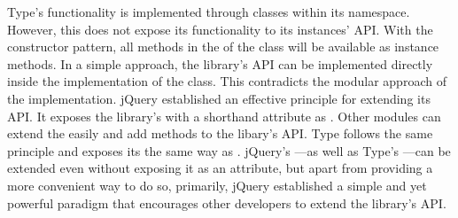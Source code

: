 Type's functionality is implemented through classes within its namespace. However, this does not expose its functionality to its instances' API. With the constructor pattern, all methods in the  of the  class will be available as instance methods. In a simple approach, the library's API can be implemented directly inside the implementation of the  class. This contradicts the modular approach of the implementation. jQuery established an effective principle for extending its API. It exposes the library's  with a shorthand attribute as . Other modules can extend the  easily and add methods to the libary's API. Type follows the same principle and exposes its  the same way as . jQuery's ---as well as Type's ---can be extended even without exposing it as an attribute, but apart from providing a more convenient way to do so, primarily, jQuery established a simple and yet powerful paradigm that encourages other developers to extend the library's API.






